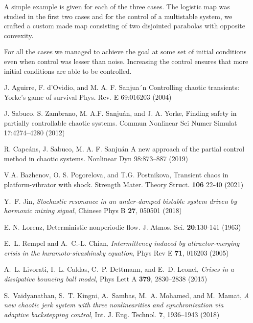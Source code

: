 A simple example is given for each of the three cases. The logistic map was studied in the first two cases and for the control of a multistable system, we crafted a custom made map consisting of two disjointed parabolas with opposite convexity.

For all the cases we managed to achieve the goal at some set of initial conditions even when control was lesser than noise. Increasing the control ensures that more initial conditions are able to be controlled.






















\clearpage



\begin{thebibliography}{05}

J. Aguirre, F. d’Ovidio, and M. A. F. Sanjua´n
Controlling chaotic transients: Yorke’s game of survival
Phys. Rev. E 69:016203 
(2004)


J. Sabuco, S. Zambrano, M. A.F. Sanjuán, and J. A. Yorke,
Finding safety in partially controllable chaotic systems.
Commun Nonlinear Sci Numer Simulat 17:4274–4280 
(2012)


R. Capeáns, J. Sabuco, M. A. F. Sanjuán
A new approach of the partial control method in chaotic
systems.
Nonlinear Dyn 98:873–887 
(2019) 


V.A. Bazhenov, O. S. Pogorelova, and T.G. Postnikova,
Transient chaos in platform-vibrator with shock.
Strength Mater. Theory Struct. \textbf{106} 22-40 
(2021)


Y.~F. Jin,
{\em Stochastic resonance in an under-damped bistable system driven by harmonic mixing signal}, 
Chinese Phys B \textbf{27}, 050501 
(2018)


E. N. Lorenz,
Deterministic nonperiodic flow.
J. Atmos. Sci. \textbf{20}:130-141 
(1963)



E.~L. Rempel and A.~C.-L. Chian, 
{\em Intermittency induced by attractor-merging crisis in the kuramoto-sivashinsky equation}, 
Phys Rev E \textbf{71}, 016203 
(2005)

A.~L. Livorati, I.~L. Caldas, C.~P. Dettmann, and E.~D. Leonel,
{\em Crises in a dissipative bouncing ball model},
Phys Lett A \textbf{379}, 2830--2838 
(2015)

S.~Vaidyanathan, S.~T. Kingni, A.~Sambas, M.~A. Mohamed, and M.~Mamat,
{\em A new chaotic jerk system with three nonlinearities and synchronization via adaptive backstepping control},
Int. J. Eng. Technol. \textbf{7}, 1936--1943 
(2018)




\end{thebibliography}